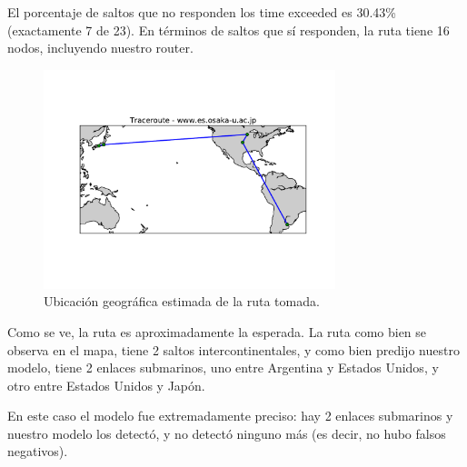 El porcentaje de saltos que no responden los time exceeded es 30.43\% (exactamente 7 de 23). En términos de saltos que sí responden, la ruta tiene 16 nodos, incluyendo nuestro router.

\begin{figure}[H]
    \centering
    \includegraphics[width=8.5cm]{img/grafico3-www-es-osaka-u-ac-jp.pdf}
    \caption{\normalfont Ubicación geográfica estimada de la ruta tomada.}
\end{figure}


Como se ve, la ruta es aproximadamente la esperada. La ruta como bien se observa en el mapa, tiene 2 saltos intercontinentales, y como bien predijo nuestro modelo, tiene 2 enlaces submarinos, uno entre Argentina y Estados Unidos, y otro entre Estados Unidos y Japón.

En este caso el modelo fue extremadamente preciso: hay 2 enlaces submarinos y nuestro modelo los detectó, y no detectó ninguno más (es decir, no hubo falsos negativos).




